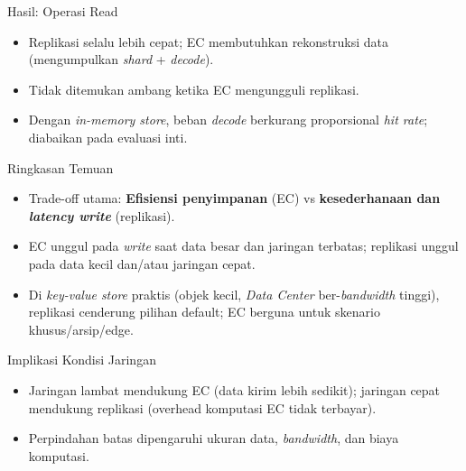 \documentclass[a2,portrait]{config/poster/a0poster}
\newcommand{\postersection}[1]{%
	\begin{tcolorbox}[
		colback=MainBlue,
		colframe=MainBlue,
		fonttitle=\bfseries,
		coltext=white,
		sharp corners,
		boxrule=0pt,
		top=0pt,
		bottom=0pt,
		halign=center
	]
	\normalsize #1
	\end{tcolorbox}%
}
\begin{document}
\begin{multicols}{2}

\postersection{Hasil: Operasi Read}
\begin{itemize}
	\item Replikasi selalu lebih cepat; EC membutuhkan rekonstruksi data (mengumpulkan \textit{shard} + \textit{decode}).
	\item Tidak ditemukan ambang ketika EC mengungguli replikasi.
	\item Dengan \textit{in-memory store}, beban \textit{decode} berkurang proporsional \textit{hit rate}; diabaikan pada evaluasi inti.
\end{itemize}


\postersection{Ringkasan Temuan}
\begin{itemize}
	\item Trade-off utama: \textbf{Efisiensi penyimpanan} (EC) vs \textbf{kesederhanaan dan \textit{latency write}} (replikasi).
	\item EC unggul pada \textit{write} saat data besar dan jaringan terbatas; replikasi unggul pada data kecil dan/atau jaringan cepat.
	\item Di \textit{key-value store} praktis (objek kecil, \textit{Data Center} ber-\textit{bandwidth} tinggi), replikasi cenderung pilihan default; EC berguna untuk skenario khusus/arsip/edge.
\end{itemize}


\postersection{Implikasi Kondisi Jaringan}
\begin{itemize}
	\item Jaringan lambat mendukung EC (data kirim lebih sedikit); jaringan cepat mendukung replikasi (overhead komputasi EC tidak terbayar).
	\item Perpindahan batas dipengaruhi ukuran data, \textit{bandwidth}, dan biaya komputasi.
\end{itemize}


\end{multicols}
\end{document}
